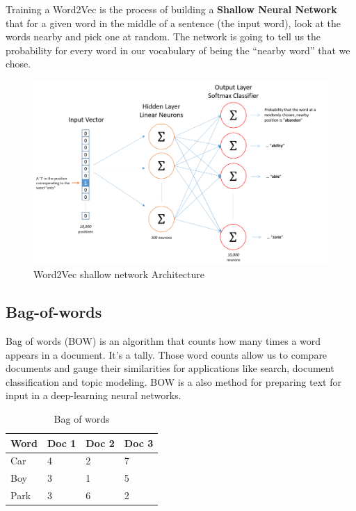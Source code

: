 Training a Word2Vec is the process of building a \textbf{Shallow Neural Network} that for a given word in the middle of a sentence (the input word), look at the words nearby and pick one at random. The network is going to tell us the probability for every word in our vocabulary of being the “nearby word” that we chose.


\begin{figure}[ht]
    \centering
    \includegraphics[scale=0.3]{Images/word2vec-shallow-network.png}
    \caption{Word2Vec shallow network Architecture}
    \label{fig:w2vsnas}
\end{figure}





\subsection{Bag-of-words}

Bag of words (BOW) is an algorithm that counts how many times a word appears in a document. It’s a tally. Those word counts allow us to compare documents and gauge their similarities for applications like search, document classification and topic modeling. BOW is a also method for preparing text for input in a deep-learning neural networks.

\begin{table}[ht]
\centering
\caption{Bag of words}
\begin{tabular}{|l|l|l|l|} 
\hline
Word & Doc 1 & Doc 2 & Doc 3  \\ 
\hline
Car  & 4     & 2     & 7      \\ 
\hline
Boy  & 3     & 1     & 5      \\ 
\hline
Park & 3     & 6     & 2      \\
\hline
\end{tabular}
\end{table}

